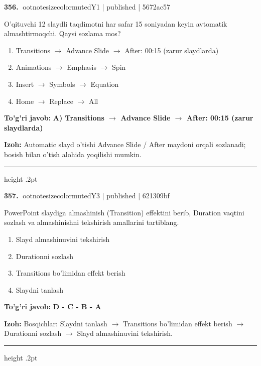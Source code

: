 \documentclass[10pt,a4paper]{article}
\begin{document}
\textbf{\color{ink}356.} {ootnotesizecolor{muted}Y1 | published | 5672ac57}
\par
O'qituvchi 12 slaydli taqdimotni har safar 15 soniyadan keyin avtomatik almashtirmoqchi. Qaysi sozlama mos?
\begin{enumerate}[label=\Alph*),leftmargin=9mm]
\item Transitions \ensuremath{\rightarrow} Advance Slide \ensuremath{\rightarrow} After: 00:15 (zarur slaydlarda)
\item Animations \ensuremath{\rightarrow} Emphasis \ensuremath{\rightarrow} Spin
\item Insert \ensuremath{\rightarrow} Symbols \ensuremath{\rightarrow} Equation
\item Home \ensuremath{\rightarrow} Replace \ensuremath{\rightarrow} All
\end{enumerate}
\begin{tcolorbox}[enhanced,breakable,colback=teal!4,colframe=teal!55!black,boxrule=0.45pt,arc=1.2mm,left=2.8mm,right=2.8mm,top=2mm,bottom=2mm]
\textbf{\color{teal}To'g'ri javob:} \textbf{A) Transitions \ensuremath{\rightarrow} Advance Slide \ensuremath{\rightarrow} After: 00:15 (zarur slaydlarda)}
\par\smallskip
\textbf{Izoh:} Automatic slayd o'tishi Advance Slide / After maydoni orqali sozlanadi; bosish bilan o'tish alohida yoqilishi mumkin.
\end{tcolorbox}
\vspace{2mm}\hrule height .2pt\vspace{2mm}

\textbf{\color{ink}357.} {ootnotesizecolor{muted}Y3 | published | 621309bf}
\par
PowerPoint slaydiga almashinish (Transition) effektini berib, Duration vaqtini sozlash va almashinishni tekshirish amallarini tartiblang.
\begin{enumerate}[label=\Alph*),leftmargin=9mm]
\item Slayd almashinuvini tekshirish
\item Durationni sozlash
\item Transitions bo'limidan effekt berish
\item Slaydni tanlash
\end{enumerate}
\begin{tcolorbox}[enhanced,breakable,colback=teal!4,colframe=teal!55!black,boxrule=0.45pt,arc=1.2mm,left=2.8mm,right=2.8mm,top=2mm,bottom=2mm]
\textbf{\color{teal}To'g'ri javob:} \textbf{D - C - B - A}
\par\smallskip
\textbf{Izoh:} Bosqichlar: Slaydni tanlash \ensuremath{\rightarrow} Transitions bo'limidan effekt berish \ensuremath{\rightarrow} Durationni sozlash \ensuremath{\rightarrow} Slayd almashinuvini tekshirish.
\end{tcolorbox}
\vspace{2mm}\hrule height .2pt\vspace{2mm}
\end{document}
